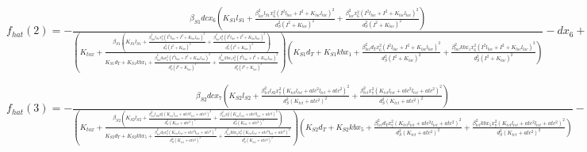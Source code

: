 $f_{hat}(2)=- \frac{\beta_{S1} dc x_{6} \left(K_{S1} l_{S1} + \frac{\beta_{lac}^{2} l_{S1} x_{6}^{2} \left(I^{2} l_{lac} + I^{2} + K_{lac} l_{lac}\right)^{2}}{d_{S}^{2} \left(I^{2} + K_{lac}\right)^{2}} + \frac{\beta_{lac}^{2} x_{6}^{2} \left(I^{2} l_{lac} + I^{2} + K_{lac} l_{lac}\right)^{2}}{d_{S}^{2} \left(I^{2} + K_{lac}\right)^{2}}\right)}{\left(K_{tox} + \frac{\beta_{S1} \left(K_{S1} l_{S1} + \frac{\beta_{lac}^{2} l_{S1} x_{6}^{2} \left(I^{2} l_{lac} + I^{2} + K_{lac} l_{lac}\right)^{2}}{d_{S}^{2} \left(I^{2} + K_{lac}\right)^{2}} + \frac{\beta_{lac}^{2} x_{6}^{2} \left(I^{2} l_{lac} + I^{2} + K_{lac} l_{lac}\right)^{2}}{d_{S}^{2} \left(I^{2} + K_{lac}\right)^{2}}\right)}{K_{S1} d_{T} + K_{S1} kb x_{1} + \frac{\beta_{lac}^{2} d_{T} x_{6}^{2} \left(I^{2} l_{lac} + I^{2} + K_{lac} l_{lac}\right)^{2}}{d_{S}^{2} \left(I^{2} + K_{lac}\right)^{2}} + \frac{\beta_{lac}^{2} kb x_{1} x_{6}^{2} \left(I^{2} l_{lac} + I^{2} + K_{lac} l_{lac}\right)^{2}}{d_{S}^{2} \left(I^{2} + K_{lac}\right)^{2}}}\right) \left(K_{S1} d_{T} + K_{S1} kb x_{1} + \frac{\beta_{lac}^{2} d_{T} x_{6}^{2} \left(I^{2} l_{lac} + I^{2} + K_{lac} l_{lac}\right)^{2}}{d_{S}^{2} \left(I^{2} + K_{lac}\right)^{2}} + \frac{\beta_{lac}^{2} kb x_{1} x_{6}^{2} \left(I^{2} l_{lac} + I^{2} + K_{lac} l_{lac}\right)^{2}}{d_{S}^{2} \left(I^{2} + K_{lac}\right)^{2}}\right)} - d x_{6} + kc x_{6} \left(1 - \frac{x_{6} + x_{7}}{C_{max}}\right)$


$f_{hat}(3)=- \frac{\beta_{S2} dc x_{7} \left(K_{S2} l_{S2} + \frac{\beta_{tet}^{2} l_{S2} x_{7}^{2} \left(K_{tet} l_{tet} + atc^{2} l_{tet} + atc^{2}\right)^{2}}{d_{S}^{2} \left(K_{tet} + atc^{2}\right)^{2}} + \frac{\beta_{tet}^{2} x_{7}^{2} \left(K_{tet} l_{tet} + atc^{2} l_{tet} + atc^{2}\right)^{2}}{d_{S}^{2} \left(K_{tet} + atc^{2}\right)^{2}}\right)}{\left(K_{tox} + \frac{\beta_{S2} \left(K_{S2} l_{S2} + \frac{\beta_{tet}^{2} l_{S2} x_{7}^{2} \left(K_{tet} l_{tet} + atc^{2} l_{tet} + atc^{2}\right)^{2}}{d_{S}^{2} \left(K_{tet} + atc^{2}\right)^{2}} + \frac{\beta_{tet}^{2} x_{7}^{2} \left(K_{tet} l_{tet} + atc^{2} l_{tet} + atc^{2}\right)^{2}}{d_{S}^{2} \left(K_{tet} + atc^{2}\right)^{2}}\right)}{K_{S2} d_{T} + K_{S2} kb x_{5} + \frac{\beta_{tet}^{2} d_{T} x_{7}^{2} \left(K_{tet} l_{tet} + atc^{2} l_{tet} + atc^{2}\right)^{2}}{d_{S}^{2} \left(K_{tet} + atc^{2}\right)^{2}} + \frac{\beta_{tet}^{2} kb x_{5} x_{7}^{2} \left(K_{tet} l_{tet} + atc^{2} l_{tet} + atc^{2}\right)^{2}}{d_{S}^{2} \left(K_{tet} + atc^{2}\right)^{2}}}\right) \left(K_{S2} d_{T} + K_{S2} kb x_{5} + \frac{\beta_{tet}^{2} d_{T} x_{7}^{2} \left(K_{tet} l_{tet} + atc^{2} l_{tet} + atc^{2}\right)^{2}}{d_{S}^{2} \left(K_{tet} + atc^{2}\right)^{2}} + \frac{\beta_{tet}^{2} kb x_{5} x_{7}^{2} \left(K_{tet} l_{tet} + atc^{2} l_{tet} + atc^{2}\right)^{2}}{d_{S}^{2} \left(K_{tet} + atc^{2}\right)^{2}}\right)} - d x_{7} + kc x_{7} \left(1 - \frac{x_{6} + x_{7}}{C_{max}}\right)$



